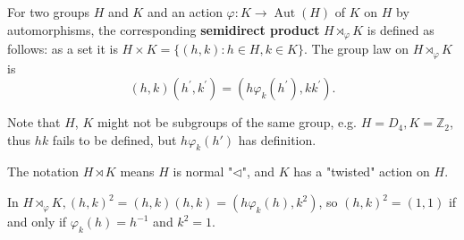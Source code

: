 \begin{definition}
For two groups $H$ and $K$ and an action $\varphi: K \rightarrow \operatorname{Aut}(H)$ of $K$ on $H$ by automorphisms, the corresponding \textbf{semidirect product} $H \rtimes_{\varphi} K$ is defined as follows: as a set it is $H \times K=\{(h, k): h \in H, k \in K\}$. The group law on $H \rtimes_{\varphi} K$ is
\[
(h, k)\left(h^{\prime}, k^{\prime}\right)=\left(h \varphi_k\left(h^{\prime}\right), k k^{\prime}\right) .
\]
\end{definition}
\begin{note}
Note that $H$, $K$ might not be subgroups of the same group, e.g. $H=D_4,K=\mathbb{Z}_{2}$, thus $hk$ fails to be defined, but $h\varphi _k(h')$ has definition.
\end{note}
\begin{remark}
The notation $H\rtimes K$ means $H$ is normal "$\lhd$", and $K$ has a "twisted" action on $H$.
\end{remark}
\begin{example}
In $H \rtimes_{\varphi} K, (h, k)^2=(h, k)(h, k)=\left(h \varphi_k(h), k^2\right)$, so $(h, k)^2=(1,1)$ if and only if $\varphi_k(h)=h^{-1}$ and $k^2=1$.
\end{example}
